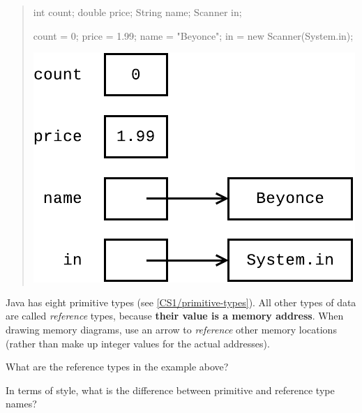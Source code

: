 
\begin{quote}
\begin{multicols}{2}

\begin{javalst}
int count;
double price;
String name;
Scanner in;

count = 0;
price = 1.99;
name = "Beyonce";
in = new Scanner(System.in);
\end{javalst}

\includegraphics[width=\linewidth]{CS1/reference1.pdf}

\end{multicols}
\end{quote}

Java has eight primitive types (see \ref{CS1/primitive-types}).
All other types of data are called \emph{reference} types, because \textbf{their value is a memory address}.
When drawing memory diagrams, use an arrow to \emph{reference} other memory locations (rather than make up integer values for the actual addresses).




\Q What are the reference types in the example above?

\begin{answer}
\end{answer}


\Q In terms of style, what is the difference between primitive and reference type names?

\begin{answer}
\end{answer}


